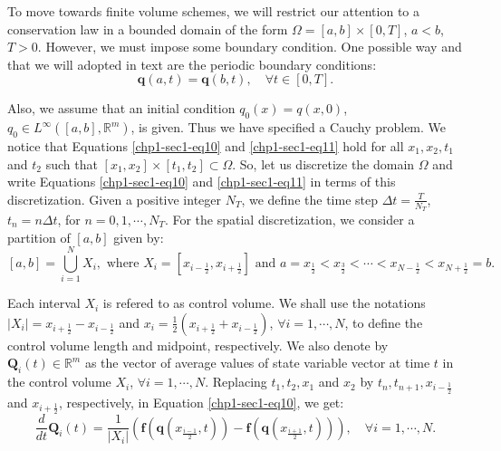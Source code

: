 To move towards finite volume schemes, we will restrict our attention
to a conservation law in a bounded domain of the form 
$\Omega = [a,b]\times[0,T]$, $a<b$, $T>0$. However, we must 
impose some boundary condition. One possible way and that we will adopted 
in text are the periodic boundary conditions:
\begin{equation}
        \label{chp1-sec1-eq12}
	\mathbf{q}(a, t) = \mathbf{q}(b, t),\quad \forall t \in [0, T].
\end{equation}

Also, we assume that an initial condition $q_0(x) = q(x,0)$, $q_0 \in L^{\infty}([a,b],\mathbb{R}^m)$, is given.
Thus we have specified a Cauchy problem.
We notice that Equations \eqref{chp1-sec1-eq10} and \eqref{chp1-sec1-eq11}
hold for all $x_1, x_2, t_1$ and $t_2$ such that
$[x_1, x_2] \times [t_1, t_2] \subset \Omega$.
So, let us discretize the domain $\Omega$ and write 
Equations \eqref{chp1-sec1-eq10} and \eqref{chp1-sec1-eq11} in terms of this discretization.
Given a positive integer $N_T$, 
we define the time step $\Delta t = \frac{T}{N_T}$, $t_n = n \Delta t$, for $n = 0, 1 ,\cdots, N_T$.
For the spatial discretization, we consider a partition of $[a, b]$ given by: 
\begin{equation}
	\label{chp1-sec1-eq13}
	[a,b] = \bigcup_{i=1}^N X_i, 
	\text{ where } X_i= [x_{i-\frac{1}{2}}, x_{i+\frac{1}{2}}] \text{ and } 
	a = x_{\frac{1}{2}} < x_{\frac{3}{2}} < \cdots < x_{N-\frac{1}{2}} < x_{N+\frac{1}{2}} = b.
\end{equation}

Each interval $X_i$ is refered to as control volume. 
We shall use the notations $|X_i| = x_{i+\frac{1}{2}} - x_{i-\frac{1}{2}}$ 
and $x_i = \frac{1}{2}(x_{i+\frac{1}{2}} + x_{i-\frac{1}{2}})$, $\forall i = 1, \cdots, N$, 
to define the control volume length and midpoint, respectively.
We also denote by $\mathbf{Q}_i(t) \in \mathbb{R}^m$ as the vector of 
average values of state variable vector at time $t$
in the control volume $X_i$, $\forall i = 1, \cdots, N$. Replacing $t_1, t_2, x_1$ and 
$x_2$ by $t_{n}, t_{n+1}, x_{i-\frac{1}{2}}$ and $x_{i+\frac{1}{2}}$,
respectively, in Equation \ref{chp1-sec1-eq10}, we get:
\begin{equation}
        \label{chp1-sec1-eq14}
	\frac{d}{dt} \mathbf{Q}_i(t) = \frac{1}{|X_i|}
	(\mathbf{f}(\mathbf{q}(x_{\frac{i-1}{2}},t)) -
	\mathbf{f}(\mathbf{q}(x_{\frac{i+1}{2}},t))) ,
	\quad \forall i = 1, \cdots, N.
\end{equation}

